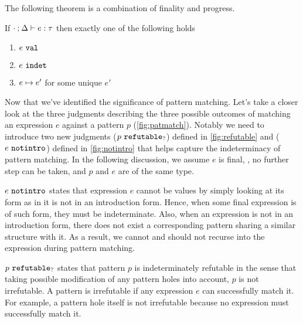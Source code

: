 The following theorem is a combination of finality and progress.
\begin{theorem}[Determinism]
  \label{theorem:determinism}
  If $\cdot \mathbin{;} \Delta \vdash e : \tau$ then exactly one of the following holds
  \begin{enumerate}
    \item $e ~\mathtt{val}$
    \item $e ~\mathtt{indet}$
    \item $e \mapsto e'$ for some unique $e'$
  \end{enumerate}
\end{theorem}




Now that we've identified the significance of pattern matching. Let's take a closer look at the three judgments describing the three possible outcomes of matching an expression $e$ against a pattern $p$ (\autoref{fig:patmatch}). Notably we need to introduce two new judgments ($p ~\mathtt{refutable}_?$) defined in \autoref{fig:refutable} and ($e ~\mathtt{notintro}$) defined in \autoref{fig:notintro} that helps capture the indeterminacy of pattern matching. In the following discussion, we assume $e$ is final, \ie, no further step can be taken, and $p$ and $e$ are of the same type.

$e ~\mathtt{notintro}$ states that expression $e$ cannot be values by simply looking at its form as in it is not in an introduction form. Hence, when some final expression is of such form, they must be indeterminate. Also, when an expression is not in an introduction form, there does not exist a corresponding pattern sharing a similar structure with it. As a result, we cannot and should not recurse into the expression during pattern matching.

$p ~\mathtt{refutable}_?$ states that pattern $p$ is indeterminately refutable in the sense that taking possible modification of any pattern holes into account, $p$ is not irrefutable. A pattern is irrefutable if any expression $e$ can successfully match it. For example, a pattern hole itself is not irrefutable because no expression must successfully match it.

